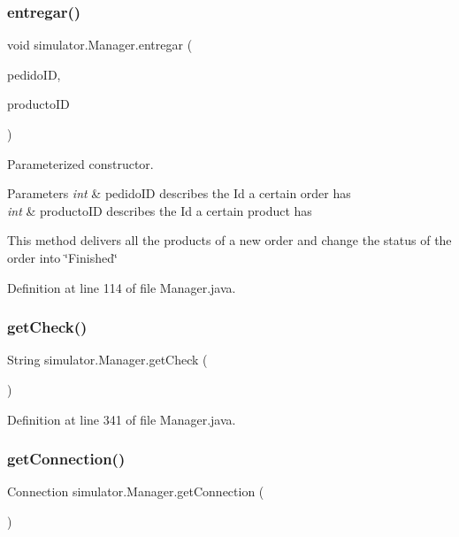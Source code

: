 \subsubsection{\texorpdfstring{entregar()}{entregar()}}
{\footnotesize\ttfamily void simulator.\+Manager.\+entregar (\begin{DoxyParamCaption}\item[{int}]{pedido\+ID,  }\item[{int}]{producto\+ID }\end{DoxyParamCaption})}

Parameterized constructor.


\begin{DoxyParams}{Parameters}
{\em int} & pedido\+ID describes the Id a certain order has \\
\hline
{\em int} & producto\+ID describes the Id a certain product has\\
\hline
\end{DoxyParams}
This method delivers all the products of a new order and change the status of the order into \char`\"{}\+Finished\char`\"{} 

Definition at line 114 of file Manager.\+java.

\mbox{\label{classsimulator_1_1_manager_a74a372ec99052be3ceced43baeedbeac}} 
\subsubsection{\texorpdfstring{get\+Check()}{getCheck()}}
{\footnotesize\ttfamily String simulator.\+Manager.\+get\+Check (\begin{DoxyParamCaption}{ }\end{DoxyParamCaption})}



Definition at line 341 of file Manager.\+java.

\mbox{\label{classsimulator_1_1_manager_a2a8f351e284baaf0b7ecd92dbf71468b}} 
\subsubsection{\texorpdfstring{get\+Connection()}{getConnection()}}
{\footnotesize\ttfamily Connection simulator.\+Manager.\+get\+Connection (\begin{DoxyParamCaption}{ }\end{DoxyParamCaption})}



